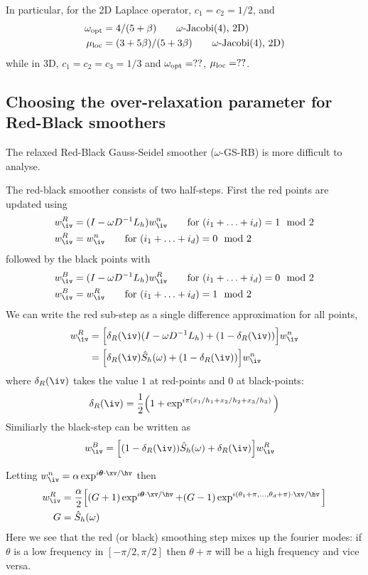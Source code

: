 \documentclass{article}
\begin{document}
In particular, for the 2D Laplace operator, $c_1=c_2=1/2$,  and
\begin{align*}
 \omega_{\rm opt} & =4/(5+\beta)  \qquad \mbox{$\omega$-Jacobi(4), 2D)} \\
  \mu_{\rm loc} & =(3+5\beta)/(5+3\beta) \qquad \mbox{$\omega$-Jacobi(4), 2D)}
\end{align*}
while in 3D, $c_1=c_2=c_3=1/3$ and $\omega_{\rm opt}=??$, $\mu_{\rm loc}=??$.


\subsection{Choosing the over-relaxation parameter for Red-Black smoothers}

The relaxed Red-Black Gauss-Seidel smoother ($\omega$-GS-RB) is more difficult to analyse.


The red-black smoother consists of two half-steps. First the red points are updated using
\begin{align*}
  w_{\iv}^R &=  (I - \omega D^{-1} L_h ) w_{\iv}^{n}   \qquad\mbox{for $(i_1+\ldots+i_d) = 1\mod 2$} \\
  w_{\iv}^R &= w_{\iv}^{n} \qquad\mbox{for $(i_1+\ldots+i_d) = 0\mod 2$}
\end{align*}
followed by the black points with 
\begin{align*}
  w_{\iv}^B &=  (I - \omega D^{-1} L_h ) w_{\iv}^{R}   \qquad\mbox{for $(i_1+\ldots+i_d) = 0\mod 2$} \\
  w_{\iv}^B &= w_{\iv}^{R} \qquad\mbox{for $(i_1+\ldots+i_d) = 1\mod 2$}
\end{align*}
We can write the red sub-step as a single difference approximation for all points, 
\begin{align*}
  w_{\iv}^R &= \Big[ \delta_R(\iv) (I - \omega D^{-1} L_h ) + (1-\delta_R(\iv)) \Big] w_{\iv}^{n} \\
            &= \Big[ \delta_R(\iv) \hat{S}_h(\omega) + (1-\delta_R(\iv)) \Big] w_{\iv}^{n}
\end{align*}
where $\delta_R(\iv)$ takes the value $1$ at red-points and $0$ at black-points:
\[
  \delta_R(\iv) = {1\over2}\Big( 1 + \exp^{i \pi( x_1/h_1 + x_2/h_2 + x_3/h_3 ) } \Big)
\]
Similiarly the black-step can be written as
\begin{align*}
  w_{\iv}^B &= \Big[ (1-\delta_R(\iv)) \hat{S}_h(\omega) + \delta_R(\iv) \Big] w_{\iv}^{R}
\end{align*}

Letting $w_{\iv}^{n} = \alpha \exp^{ i \thetav\cdot\xv/\hv }$ then
\begin{align*}
w_{\iv}^R &={\alpha\over2}\Big[ (G+1)\exp^{ i \thetav\cdot\xv/\hv } 
           + (G-1)\exp^{ i (\theta_1+\pi,\ldots,\theta_d+\pi)\cdot\xv/\hv } \Big] \\
   G&= \hat{S}_h(\omega)
\end{align*}
Here we see that the red (or black) smoothing step mixes up the fourier modes: if $\theta$ is a 
low frequency in $[-\pi/2,\pi/2]$ then $\theta+\pi$ will be a high frequency and vice versa.
\end{document}
